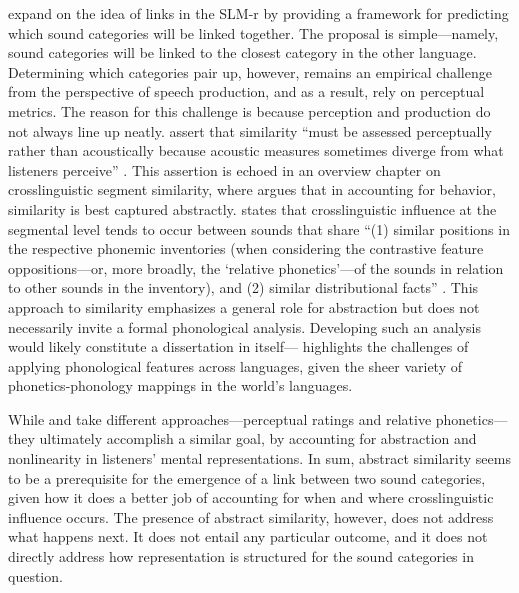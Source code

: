 \citet{flege_2021_slmr} expand on the idea of links in the SLM-r by providing a framework for predicting which sound categories will be linked together. The proposal is simple---namely, sound categories will be linked to the closest category in the other language. Determining which categories pair up, however, remains an empirical challenge from the perspective of speech production, and as a result, \citet{flege_2021_slmr} rely on perceptual metrics. The reason for this challenge is because perception and production do not always line up neatly. \citeauthor{flege_2021_slmr} assert that similarity ``must be assessed perceptually rather than acoustically because acoustic measures sometimes diverge from what listeners perceive'' \citeyearpar[][p. 33]{flege_2021_slmr}. This assertion is echoed in an overview chapter on crosslinguistic segment similarity, where \citet{chang_2015_similarity} argues that in accounting for behavior, similarity is best captured abstractly. \citeauthor{chang_2015_similarity} states that crosslinguistic influence at the segmental level tends to occur between sounds that share ``(1) similar positions in the respective phonemic inventories (when considering the contrastive feature oppositions---or, more broadly, the `relative phonetics'---of the sounds in relation to other sounds in the inventory), and (2) similar distributional facts'' \citeyearpar[][p. 201]{chang_2015_similarity}. This approach to similarity emphasizes a general role for abstraction but does not necessarily invite a formal phonological analysis. Developing such an analysis would likely constitute a dissertation in itself---\citet{mielke_2012_similarity} highlights the challenges of applying phonological features across languages, given the sheer variety of phonetics-phonology mappings in the world's languages. 

While \citet{flege_2021_slmr} and \citet{chang_2015_similarity} take different approaches---perceptual ratings and relative phonetics---they ultimately accomplish a similar goal, by accounting for abstraction and nonlinearity in listeners' mental representations. In sum, abstract similarity seems to be a prerequisite for the emergence of a link between two sound categories, given how it does a better job of accounting for when and where crosslinguistic influence occurs. The presence of abstract similarity, however, does not address what happens next. It does not entail any particular outcome, and it does not directly address how representation is structured for the sound categories in question. 

